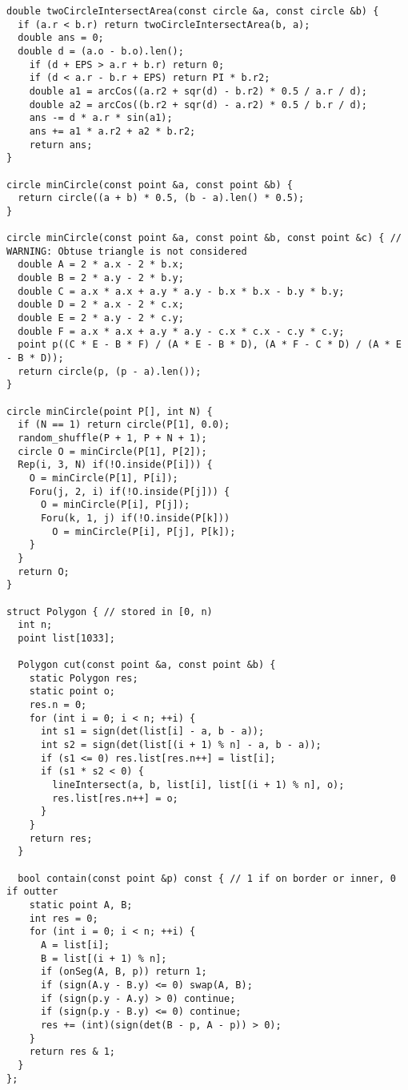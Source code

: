 \begin{lstlisting}
double twoCircleIntersectArea(const circle &a, const circle &b) {
  if (a.r < b.r) return twoCircleIntersectArea(b, a);
  double ans = 0;
  double d = (a.o - b.o).len();
    if (d + EPS > a.r + b.r) return 0;
    if (d < a.r - b.r + EPS) return PI * b.r2;
    double a1 = arcCos((a.r2 + sqr(d) - b.r2) * 0.5 / a.r / d);
    double a2 = arcCos((b.r2 + sqr(d) - a.r2) * 0.5 / b.r / d);
    ans -= d * a.r * sin(a1);
    ans += a1 * a.r2 + a2 * b.r2;
    return ans;
}

circle minCircle(const point &a, const point &b) {
  return circle((a + b) * 0.5, (b - a).len() * 0.5);
}

circle minCircle(const point &a, const point &b, const point &c) { // WARNING: Obtuse triangle is not considered
  double A = 2 * a.x - 2 * b.x;
  double B = 2 * a.y - 2 * b.y;
  double C = a.x * a.x + a.y * a.y - b.x * b.x - b.y * b.y;
  double D = 2 * a.x - 2 * c.x;
  double E = 2 * a.y - 2 * c.y;
  double F = a.x * a.x + a.y * a.y - c.x * c.x - c.y * c.y;
  point p((C * E - B * F) / (A * E - B * D), (A * F - C * D) / (A * E - B * D));
  return circle(p, (p - a).len());
}

circle minCircle(point P[], int N) {
  if (N == 1) return circle(P[1], 0.0);
  random_shuffle(P + 1, P + N + 1);
  circle O = minCircle(P[1], P[2]);
  Rep(i, 3, N) if(!O.inside(P[i])) {
    O = minCircle(P[1], P[i]);
    Foru(j, 2, i) if(!O.inside(P[j])) {
      O = minCircle(P[i], P[j]);
      Foru(k, 1, j) if(!O.inside(P[k]))
        O = minCircle(P[i], P[j], P[k]);
    }
  }
  return O;
}

struct Polygon { // stored in [0, n)
  int n;
  point list[1033];

  Polygon cut(const point &a, const point &b) {
    static Polygon res;
    static point o;
    res.n = 0;
    for (int i = 0; i < n; ++i) {
      int s1 = sign(det(list[i] - a, b - a));
      int s2 = sign(det(list[(i + 1) % n] - a, b - a));
      if (s1 <= 0) res.list[res.n++] = list[i];
      if (s1 * s2 < 0) {
        lineIntersect(a, b, list[i], list[(i + 1) % n], o);
        res.list[res.n++] = o;
      }
    }
    return res;
  }

  bool contain(const point &p) const { // 1 if on border or inner, 0 if outter
    static point A, B;
    int res = 0;
    for (int i = 0; i < n; ++i) {
      A = list[i];
      B = list[(i + 1) % n];
      if (onSeg(A, B, p)) return 1;
      if (sign(A.y - B.y) <= 0) swap(A, B);
      if (sign(p.y - A.y) > 0) continue;
      if (sign(p.y - B.y) <= 0) continue;
      res += (int)(sign(det(B - p, A - p)) > 0);
    }
    return res & 1;
  }
};


\end{lstlisting}
